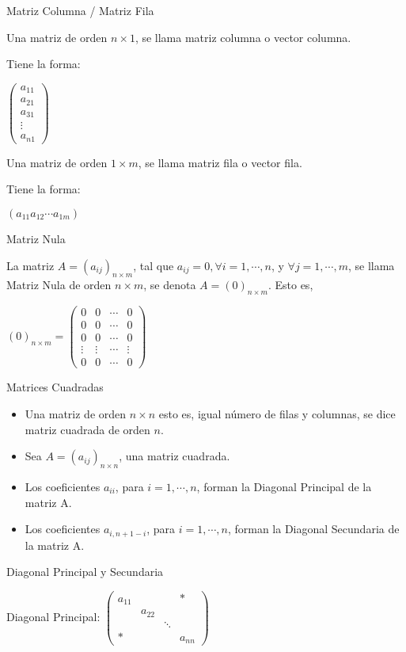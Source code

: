 {Matriz Columna / Matriz Fila}

Una matriz de orden $n\times 1$, se llama matriz columna o vector columna.

Tiene la forma:

$\left(
\begin{array}{c}
a_{11}\\
a_{21}\\
a_{31}\\
\vdots \\
a_{n1}
\end{array}
\right)$

Una matriz de orden $1\times m$, se llama matriz fila o vector fila.

Tiene la forma:

$\left( a_{11}  a_{12}  \cdots  a_{1m} \right )$


{Matriz Nula}

La matriz $A=(a_{ij})_{n\times m}$, tal que $a_{ij}=0, \forall i= 1, \cdots, n$, y $ \forall j= 1, \cdots, m$,
 se llama Matriz Nula de orden $n\times m$, se denota $A=(0)_{n\times m}$.  Esto es,

$(0)_{n\times m} = \left(
\begin{array}{cccc}
0 & 0 & \cdots & 0\\
0 & 0 & \cdots & 0\\
0 & 0 & \cdots & 0\\
\vdots  & \vdots  & \cdots & \vdots\\
0 & 0 & \cdots & 0
\end{array}
\right)$


{Matrices Cuadradas}

\begin{itemize}
\item
Una  matriz de orden $n\times n$ esto es, igual número de filas y columnas,  se dice matriz cuadrada
de orden $n$.

\item
Sea  $A=(a_{ij})_{n\times n}$, una matriz cuadrada. 

\item
Los coeficientes $a_{ii}$, para $i=1, \cdots, n$, forman la Diagonal Principal de la matriz A.

\item
Los coeficientes $a_{i,n+1-i}$, para $i=1, \cdots, n$, forman la Diagonal Secundaria de la matriz A.
\end{itemize}


{Diagonal Principal y Secundaria}

Diagonal Principal:
$   \left(
\begin{array}{cccc}
a_{11} &             &             &     *    \\
            & a_{22} &             &            \\
            &             & \ddots  &             \\
     *     &            &               & a_{n n}
\end{array}
\right)$


